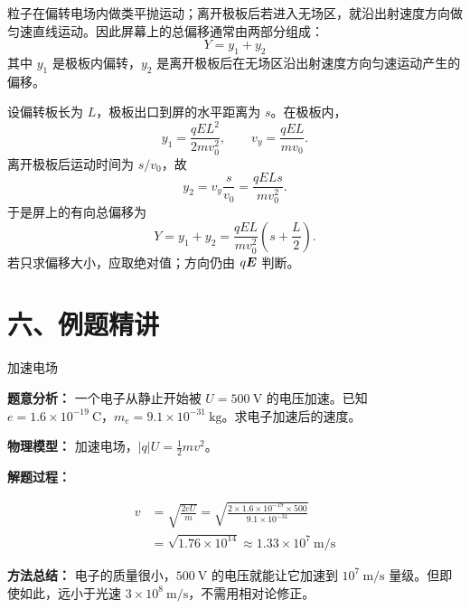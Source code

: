 粒子在偏转电场内做类平抛运动；离开极板后若进入无场区，就沿出射速度方向做匀速直线运动。因此屏幕上的总偏移通常由两部分组成：
\[
Y = y_1 + y_2
\]
其中 $y_1$ 是极板内偏转，$y_2$ 是离开极板后在无场区沿出射速度方向匀速运动产生的偏移。

设偏转板长为 $L$，极板出口到屏的水平距离为 $s$。在极板内，
\[
y_1=\frac{qEL^2}{2mv_0^2},
\qquad
v_y=\frac{qEL}{mv_0}.
\]
离开极板后运动时间为 $s/v_0$，故
\[
y_2=v_y\frac{s}{v_0}
=\frac{qELs}{mv_0^2}.
\]
于是屏上的有向总偏移为
\[
\boxed{Y=y_1+y_2
=\frac{qEL}{mv_0^2}\left(s+\frac L2\right)}.
\]
若只求偏移大小，应取绝对值；方向仍由 $q\boldsymbol{E}$ 判断。

\begin{center}


\label{fig:post-deflection-drift}
\end{center}

\newpage
\section*{六、例题精讲}

\begin{examplebox}{加速电场}

\textbf{题意分析：} 一个电子从静止开始被 $U = 500\ \mathrm{V}$ 的电压加速。已知 $e = 1.6 \times 10^{-19}\ \mathrm{C}$，$m_e = 9.1 \times 10^{-31}\ \mathrm{kg}$。求电子加速后的速度。

\textbf{物理模型：} 加速电场，$\lvert q\rvert U = \frac12 mv^2$。

\textbf{解题过程：}

\[
\begin{aligned}
v &= \sqrt{\frac{2eU}{m}}
= \sqrt{\frac{2 \times 1.6 \times 10^{-19} \times 500}{9.1 \times 10^{-31}}} \\
&= \sqrt{1.76 \times 10^{14}}
\approx 1.33 \times 10^7\ \mathrm{m/s}
\end{aligned}
\]

\textbf{方法总结：} 电子的质量很小，$500\ \mathrm{V}$ 的电压就能让它加速到 $10^7\ \mathrm{m/s}$ 量级。但即使如此，远小于光速 $3 \times 10^8\ \mathrm{m/s}$，不需用相对论修正。

\end{examplebox}

